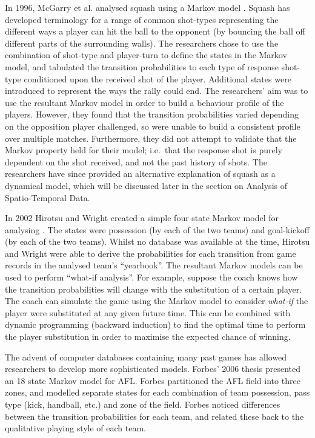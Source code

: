 In 1996, McGarry et al. analysed squash using a Markov model
\cite{McGarry1996}. Squash has developed terminology for
a range of common shot-types representing the different ways a player
can hit the ball to the opponent (by bouncing the ball off different
parts of the surrounding walls). The researchers chose to use the
combination of shot-type and player-turn to define the states in the
Markov model, and tabulated the transition probabilities to each type of
response shot-type conditioned upon the received shot of the player.
Additional states were introduced to represent the ways the rally could
end. The researchers' aim was to use the resultant Markov model in order
to build a behaviour profile of the players. However, they found that
the transition probabilities varied depending on the opposition player
challenged, so were unable to build a consistent profile over multiple
matches. Furthermore, they did not attempt to validate that the Markov
property held for their model; i.e.~that the response shot is purely
dependent on the shot received, and not the past history of shots. The
researchers have since provided an alternative explanation of squash as
a dynamical model, which will be discussed later in the section on
Analysis of Spatio-Temporal Data.

In 2002 Hirotsu and Wright created a simple four state Markov model for
analysing \soccer{} \cite{Hirotsu2002}. The
states were possession (by each of the two teams) and goal-kickoff (by
each of the two teams). Whilst no database was available at the time,
Hirotsu and Wright were able to derive the probabilities for each transition from
game records in the analysed team's ``yearbook''. The resultant
Markov models can be used to perform ``what-if analysis''. For example,
suppose the coach knows how the transition probabilities will change
with the substitution of a certain player. The coach can simulate the
game using the Markov model to consider \emph{what-if} the player were
substituted at any given future time. This can be combined with dynamic
programming (backward induction) to find the optimal time to perform the
player substitution in order to maximise the expected chance of winning.

The advent of computer databases containing many past games has allowed
researchers to develop more sophisticated models. Forbes' 2006 thesis
\cite{Forbes2006} presented an 18 state Markov model for
AFL. Forbes partitioned the AFL field into three zones, and modelled
separate states for each combination of team possession, pass type
(kick, handball, etc.) and zone of the field. Forbes noticed differences
between the transition probabilities for each team, and related these
back to the qualitative playing style of each team.

